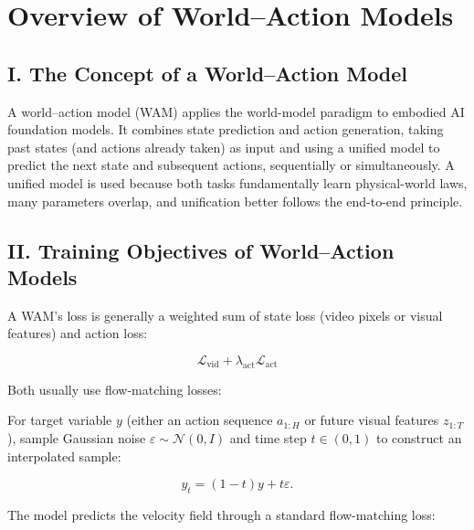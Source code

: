\setcounter{section}{0}

\hypertarget{overview-of-worldaction-models}{%
\section{Overview of World--Action Models}\label{overview-of-worldaction-models}}

\hypertarget{i.-the-concept-of-a-worldaction-model}{%
\subsection{I. The Concept of a World--Action Model}\label{i.-the-concept-of-a-worldaction-model}}

A world--action model (WAM) applies the world-model paradigm to embodied AI foundation models. It combines state prediction and action generation, taking past states (and actions already taken) as input and using a unified model to predict the next state and subsequent actions, sequentially or simultaneously. A unified model is used because both tasks fundamentally learn physical-world laws, many parameters overlap, and unification better follows the end-to-end principle.

\hypertarget{ii.-training-objectives-of-worldaction-models}{%
\subsection{II. Training Objectives of World--Action Models}\label{ii.-training-objectives-of-worldaction-models}}

A WAM's loss is generally a weighted sum of state loss (video pixels or visual features) and action loss:

\[
\mathcal{L}_{\mathrm{vid}}+\lambda_{\mathrm{act}}\mathcal{L}_{\mathrm{act}}
\]

Both usually use flow-matching losses:

For target variable \(y\) (either an action sequence \(a_{1:H}\) or future visual features \(z_{1:T}\)), sample Gaussian noise \(\varepsilon\sim\mathcal{N}(0,I)\) and time step \(t\in(0,1)\) to construct an interpolated sample:

\[
y_t=(1-t)y+t\varepsilon.
\]

The model predicts the velocity field through a standard flow-matching loss:

